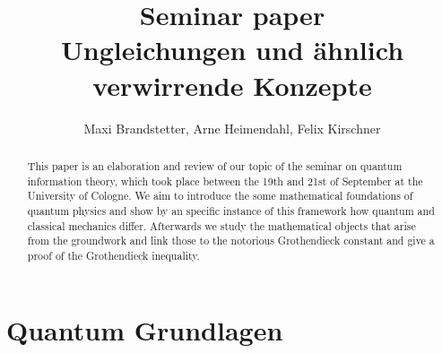

\title{Seminar paper \\ Ungleichungen und ähnlich verwirrende Konzepte}
\author{Maxi Brandstetter, Arne Heimendahl, Felix Kirschner}





\begin{abstract}
This paper is an elaboration and review of our topic of the seminar on quantum information theory, which took place between the 19th and 21st of September at the University of Cologne. We aim to introduce the some mathematical foundations of quantum physics and show by an specific instance of this framework how quantum and classical mechanics differ. Afterwards we study the mathematical objects that arise from the groundwork and link those to the notorious Grothendieck constant and give a proof of the Grothendieck inequality. 
\end{abstract}


\maketitle	
\tableofcontents
	
	
\newpage	
{}




\let \oldsection \section
\renewcommand{\section}{\vspace{15pt plus 8pt}\oldsection}
\let \oldsubsection \subsection
\renewcommand{\subsection}{\vspace{10pt plus 3pt}\oldsubsection}



\newpage
\section{Quantum Grundlagen} %
	\vspace{8pt}
	


